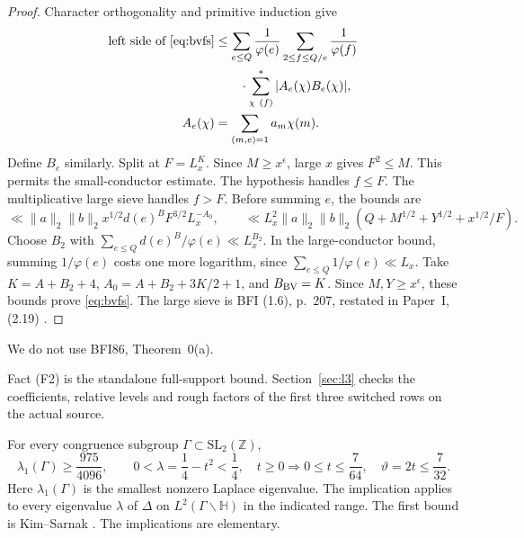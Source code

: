 \begin{proof}
Character orthogonality and primitive induction give
\[
\begin{aligned}
 \text{left side of \eqref{eq:bvfs}}
 &\le\sum_{e\le Q}\frac1{\varphi(e)}
       \sum_{2\le f\le Q/e}\frac1{\varphi(f)}\\
 &\qquad\cdot\sum_{\chi\ (f)}^*|A_e(\chi)B_e(\chi)|,\\
 A_e(\chi)&=\sum_{(m,e)=1}a_m\chi(m).
\end{aligned}
\]
Define $B_e$ similarly. Split at $F=L_x^K$.
Since $M\ge x^\epsilon$, large $x$ gives $F^2\le M$.
This permits the small-conductor estimate. The hypothesis handles $f\le F$.
The multiplicative large sieve handles $f>F$. Before summing $e$, the bounds are
\[
 \ll\|a\|_2\|b\|_2x^{1/2}d(e)^BF^{3/2}L_x^{-A_0},
 \qquad
 \ll L_x^2\|a\|_2\|b\|_2
       (Q+M^{1/2}+Y^{1/2}+x^{1/2}/F).
\]
Choose $B_2$ with $\sum_{e\le Q}d(e)^B/\varphi(e)\ll L_x^{B_2}$.
In the large-conductor bound, summing $1/\varphi(e)$ costs
one more logarithm, since $\sum_{e\le Q}1/\varphi(e)\ll L_x$.
Take $K=A+B_2+4$, $A_0=A+B_2+3K/2+1$, and $B_{\rm BV}=K$.
Since $M,Y\ge x^\epsilon$, these bounds prove \eqref{eq:bvfs}.
The large sieve is BFI (1.6), p.~207, restated in Paper~I, (2.19)
\cite[(1.6), p.~207]{BFI86}\cite[(2.19), p.~9]{PaperI}.
\end{proof}

We do not use BFI86, Theorem~0(a).

Fact (F2) is the standalone full-support bound.
Section~\ref{sec:l3} checks the coefficients, relative levels and rough
factors of the first three switched rows on the actual source.

\begin{fact}\label{fact:kim-sarnak}
For every congruence subgroup $\Gamma\subset\mathrm{SL}_2(\mathbb Z)$,
\begin{equation}\label{eq:classical-spectral-constant}
 \lambda_1(\Gamma)\ge\frac{975}{4096},\qquad
 0<\lambda=\frac14-t^2<\frac14,\quad t\ge0\Longrightarrow
 0\le t\le\frac7{64},\quad \vartheta=2t\le\frac7{32}.
\end{equation}
Here $\lambda_1(\Gamma)$ is the smallest nonzero Laplace eigenvalue.
The implication applies to every eigenvalue $\lambda$ of $\Delta$
on $L^2(\Gamma\backslash\mathbb H)$ in the indicated range.
The first bound is Kim--Sarnak \cite[Appendix~2]{KimSarnak2003}.
The implications are elementary.
\end{fact}

